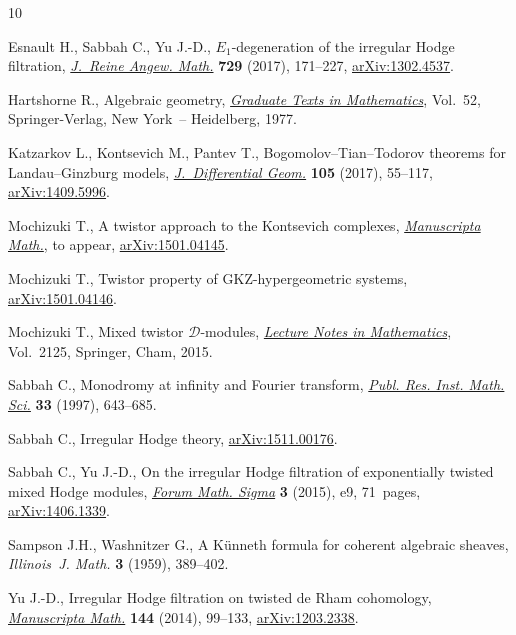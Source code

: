 \begin{thebibliography}{10}
\footnotesize\itemsep=0pt

Esnault H., Sabbah C., Yu J.-D., {$E_1$}-degeneration of the irregular {H}odge
 filtration, \href{https://doi.org/10.1515/crelle-2014-0118}{\textit{J.~Reine Angew. Math.}} \textbf{729} (2017), 171--227,
 \href{https://arxiv.org/abs/1302.4537}{arXiv:1302.4537}.

Hartshorne R., Algebraic geometry, \href{https://doi.org/10.1007/978-1-4757-3849-0}{\textit{Graduate Texts in Mathematics}}, Vol.~52, Springer-Verlag, New York~--
 Heidelberg, 1977.

Katzarkov L., Kontsevich M., Pantev T., Bogomolov--{T}ian--{T}odorov theorems
 for {L}andau--{G}inzburg models, \href{https://doi.org/10.4310/jdg/1483655860}{\textit{J.~Differential Geom.}} \textbf{105}
 (2017), 55--117, \href{https://arxiv.org/abs/1409.5996}{arXiv:1409.5996}.

Mochizuki T., A twistor approach to the {K}ontsevich complexes,
 \href{https://doi.org/10.1007/s00229-017-0989-5}{\textit{Manuscripta Math.}}, {t}o appear, \href{https://arxiv.org/abs/1501.04145}{arXiv:1501.04145}.

Mochizuki T., Twistor property of {GKZ}-hypergeometric systems,
 \href{https://arxiv.org/abs/1501.04146}{arXiv:1501.04146}.

Mochizuki T., Mixed twistor {$\mathcal D$}-modules, \href{https://doi.org/10.1007/978-3-319-10088-3}{\textit{Lecture Notes in
 Mathematics}}, Vol.~2125, Springer, Cham, 2015.

Sabbah C., Monodromy at infinity and {F}ourier transform, \href{https://doi.org/10.2977/prims/1195145150}{\textit{Publ. Res.
 Inst. Math. Sci.}} \textbf{33} (1997), 643--685.

Sabbah C., Irregular {H}odge theory, \href{https://arxiv.org/abs/1511.00176}{arXiv:1511.00176}.

Sabbah C., Yu J.-D., On the irregular {H}odge filtration of exponentially
 twisted mixed {H}odge modules, \href{https://doi.org/10.1017/fms.2015.8}{\textit{Forum Math. Sigma}} \textbf{3} (2015),
 e9, 71~pages, \href{https://arxiv.org/abs/1406.1339}{arXiv:1406.1339}.

Sampson J.H., Washnitzer G., A {K}\"unneth formula for coherent algebraic
 sheaves, \textit{Illinois~J. Math.} \textbf{3} (1959), 389--402.

Yu J.-D., Irregular {H}odge filtration on twisted de {R}ham cohomology,
 \href{https://doi.org/10.1007/s00229-013-0642-x}{\textit{Manuscripta Math.}} \textbf{144} (2014), 99--133, \href{https://arxiv.org/abs/1203.2338}{arXiv:1203.2338}.

\end{thebibliography}
